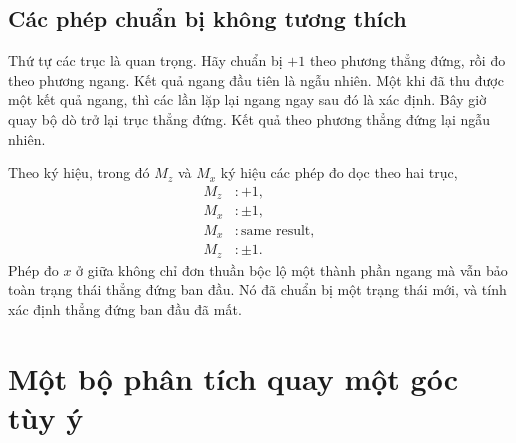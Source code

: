 \subsection{Các phép chuẩn bị không tương thích}

Thứ tự các trục là quan trọng. Hãy chuẩn bị \(+1\) theo phương thẳng đứng, rồi đo theo phương ngang. Kết quả ngang đầu tiên là ngẫu nhiên. Một khi đã thu được một kết quả ngang, thì các lần lặp lại ngang ngay sau đó là xác định. Bây giờ quay bộ dò trở lại trục thẳng đứng. Kết quả theo phương thẳng đứng lại ngẫu nhiên.

Theo ký hiệu, trong đó \(M_z\) và \(M_x\) ký hiệu các phép đo dọc theo hai trục,
\begin{equation}
\begin{aligned}
  M_z&:+1,\\
  M_x&:\pm1,\\
  M_x&:\text{same result},\\
  M_z&:\pm1.
\end{aligned}
\end{equation}
Phép đo \(x\) ở giữa không chỉ đơn thuần bộc lộ một thành phần ngang mà vẫn bảo toàn trạng thái thẳng đứng ban đầu. Nó đã chuẩn bị một trạng thái mới, và tính xác định thẳng đứng ban đầu đã mất.

\begin{classroomqa}
\end{classroomqa}

\begin{classroomqa}
\end{classroomqa}

\section{Một bộ phân tích quay một góc tùy ý}


